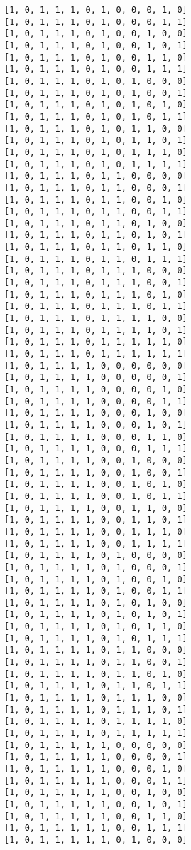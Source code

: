 \documentclass[11pt]{article}
\begin{document}
\begin{Verbatim}[commandchars=\\\{\}]
[1, 0, 1, 1, 1, 0, 1, 0, 0, 0, 1, 0]
[1, 0, 1, 1, 1, 0, 1, 0, 0, 0, 1, 1]
[1, 0, 1, 1, 1, 0, 1, 0, 0, 1, 0, 0]
[1, 0, 1, 1, 1, 0, 1, 0, 0, 1, 0, 1]
[1, 0, 1, 1, 1, 0, 1, 0, 0, 1, 1, 0]
[1, 0, 1, 1, 1, 0, 1, 0, 0, 1, 1, 1]
[1, 0, 1, 1, 1, 0, 1, 0, 1, 0, 0, 0]
[1, 0, 1, 1, 1, 0, 1, 0, 1, 0, 0, 1]
[1, 0, 1, 1, 1, 0, 1, 0, 1, 0, 1, 0]
[1, 0, 1, 1, 1, 0, 1, 0, 1, 0, 1, 1]
[1, 0, 1, 1, 1, 0, 1, 0, 1, 1, 0, 0]
[1, 0, 1, 1, 1, 0, 1, 0, 1, 1, 0, 1]
[1, 0, 1, 1, 1, 0, 1, 0, 1, 1, 1, 0]
[1, 0, 1, 1, 1, 0, 1, 0, 1, 1, 1, 1]
[1, 0, 1, 1, 1, 0, 1, 1, 0, 0, 0, 0]
[1, 0, 1, 1, 1, 0, 1, 1, 0, 0, 0, 1]
[1, 0, 1, 1, 1, 0, 1, 1, 0, 0, 1, 0]
[1, 0, 1, 1, 1, 0, 1, 1, 0, 0, 1, 1]
[1, 0, 1, 1, 1, 0, 1, 1, 0, 1, 0, 0]
[1, 0, 1, 1, 1, 0, 1, 1, 0, 1, 0, 1]
[1, 0, 1, 1, 1, 0, 1, 1, 0, 1, 1, 0]
[1, 0, 1, 1, 1, 0, 1, 1, 0, 1, 1, 1]
[1, 0, 1, 1, 1, 0, 1, 1, 1, 0, 0, 0]
[1, 0, 1, 1, 1, 0, 1, 1, 1, 0, 0, 1]
[1, 0, 1, 1, 1, 0, 1, 1, 1, 0, 1, 0]
[1, 0, 1, 1, 1, 0, 1, 1, 1, 0, 1, 1]
[1, 0, 1, 1, 1, 0, 1, 1, 1, 1, 0, 0]
[1, 0, 1, 1, 1, 0, 1, 1, 1, 1, 0, 1]
[1, 0, 1, 1, 1, 0, 1, 1, 1, 1, 1, 0]
[1, 0, 1, 1, 1, 0, 1, 1, 1, 1, 1, 1]
[1, 0, 1, 1, 1, 1, 0, 0, 0, 0, 0, 0]
[1, 0, 1, 1, 1, 1, 0, 0, 0, 0, 0, 1]
[1, 0, 1, 1, 1, 1, 0, 0, 0, 0, 1, 0]
[1, 0, 1, 1, 1, 1, 0, 0, 0, 0, 1, 1]
[1, 0, 1, 1, 1, 1, 0, 0, 0, 1, 0, 0]
[1, 0, 1, 1, 1, 1, 0, 0, 0, 1, 0, 1]
[1, 0, 1, 1, 1, 1, 0, 0, 0, 1, 1, 0]
[1, 0, 1, 1, 1, 1, 0, 0, 0, 1, 1, 1]
[1, 0, 1, 1, 1, 1, 0, 0, 1, 0, 0, 0]
[1, 0, 1, 1, 1, 1, 0, 0, 1, 0, 0, 1]
[1, 0, 1, 1, 1, 1, 0, 0, 1, 0, 1, 0]
[1, 0, 1, 1, 1, 1, 0, 0, 1, 0, 1, 1]
[1, 0, 1, 1, 1, 1, 0, 0, 1, 1, 0, 0]
[1, 0, 1, 1, 1, 1, 0, 0, 1, 1, 0, 1]
[1, 0, 1, 1, 1, 1, 0, 0, 1, 1, 1, 0]
[1, 0, 1, 1, 1, 1, 0, 0, 1, 1, 1, 1]
[1, 0, 1, 1, 1, 1, 0, 1, 0, 0, 0, 0]
[1, 0, 1, 1, 1, 1, 0, 1, 0, 0, 0, 1]
[1, 0, 1, 1, 1, 1, 0, 1, 0, 0, 1, 0]
[1, 0, 1, 1, 1, 1, 0, 1, 0, 0, 1, 1]
[1, 0, 1, 1, 1, 1, 0, 1, 0, 1, 0, 0]
[1, 0, 1, 1, 1, 1, 0, 1, 0, 1, 0, 1]
[1, 0, 1, 1, 1, 1, 0, 1, 0, 1, 1, 0]
[1, 0, 1, 1, 1, 1, 0, 1, 0, 1, 1, 1]
[1, 0, 1, 1, 1, 1, 0, 1, 1, 0, 0, 0]
[1, 0, 1, 1, 1, 1, 0, 1, 1, 0, 0, 1]
[1, 0, 1, 1, 1, 1, 0, 1, 1, 0, 1, 0]
[1, 0, 1, 1, 1, 1, 0, 1, 1, 0, 1, 1]
[1, 0, 1, 1, 1, 1, 0, 1, 1, 1, 0, 0]
[1, 0, 1, 1, 1, 1, 0, 1, 1, 1, 0, 1]
[1, 0, 1, 1, 1, 1, 0, 1, 1, 1, 1, 0]
[1, 0, 1, 1, 1, 1, 0, 1, 1, 1, 1, 1]
[1, 0, 1, 1, 1, 1, 1, 0, 0, 0, 0, 0]
[1, 0, 1, 1, 1, 1, 1, 0, 0, 0, 0, 1]
[1, 0, 1, 1, 1, 1, 1, 0, 0, 0, 1, 0]
[1, 0, 1, 1, 1, 1, 1, 0, 0, 0, 1, 1]
[1, 0, 1, 1, 1, 1, 1, 0, 0, 1, 0, 0]
[1, 0, 1, 1, 1, 1, 1, 0, 0, 1, 0, 1]
[1, 0, 1, 1, 1, 1, 1, 0, 0, 1, 1, 0]
[1, 0, 1, 1, 1, 1, 1, 0, 0, 1, 1, 1]
[1, 0, 1, 1, 1, 1, 1, 0, 1, 0, 0, 0]

\end{Verbatim}
\end{document}
